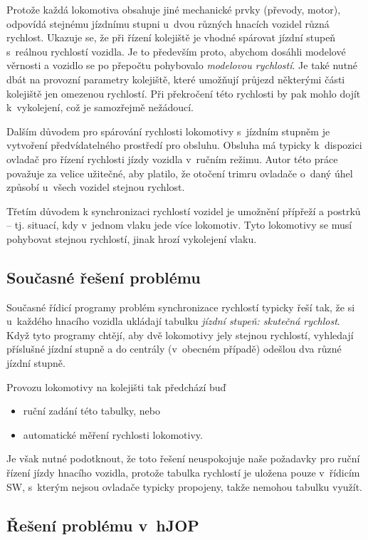 Protože každá lokomotiva obsahuje jiné mechanické prvky (převody, motor),
odpovídá stejnému jízdnímu stupni u~dvou různých hnacích vozidel různá
rychlost. Ukazuje se, že při řízení kolejiště je vhodné spárovat jízdní stupeň
s~reálnou rychlostí vozidla. Je to především proto, abychom dosáhli modelové
věrnosti a vozidlo se po přepočtu pohybovalo \textit{modelovou rychlostí}. Je
také nutné dbát na provozní parametry kolejiště, které umožňují průjezd
některými části kolejiště jen omezenou rychlostí. Při překročení této rychlosti
by pak mohlo dojít k~vykolejení, což je samozřejmě nežádoucí.

Dalším důvodem pro spárování rychlosti lokomotivy s~jízdním stupněm je
vytvoření předvídatelného prostředí pro obsluhu. Obsluha má typicky k~dispozici
ovladač pro řízení rychlosti jízdy vozidla v~ručním režimu. Autor této práce
považuje za velice užitečné, aby platilo, že otočení trimru ovladače o~daný
úhel způsobí u~všech vozidel stejnou rychlost.

Třetím důvodem k synchronizaci rychlostí vozidel je umožnění přípřeží a postrků
-- tj.  situací, kdy v~jednom vlaku jede více lokomotiv. Tyto lokomotivy se
musí pohybovat stejnou rychlostí, jinak hrozí vykolejení vlaku.

\subsection{Současné řešení problému}

Současné řídicí programy problém synchronizace rychlostí typicky řeší tak, že
si u~každého hnacího vozidla ukládají tabulku \textit{jízdní stupeň: skutečná
rychlost}. Když tyto programy chtějí, aby dvě lokomotivy jely stejnou rychlostí,
vyhledají příslušné jízdní stupně a do centrály (v~obecném případě) odešlou
dva různé jízdní stupně.

Provozu lokomotivy na kolejišti tak předchází buď

\begin{itemize}
	\item ruční zadání této tabulky, nebo
	\item automatické měření rychlosti lokomotivy.
\end{itemize}

Je však nutné podotknout, že toto řešení neuspokojuje naše požadavky pro
ruční řízení jízdy hnacího vozidla, protože tabulka rychlostí je uložena
pouze v~řídicím SW, s~kterým nejsou ovladače typicky propojeny, takže nemohou
tabulku využít.

\subsection{Řešení problému v~hJOP}

